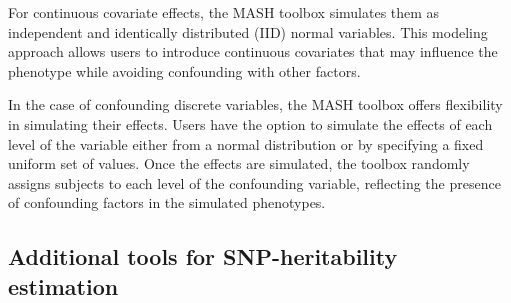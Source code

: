 \documentclass[sn-nature]{sn-jnl}%
\begin{document}
For continuous covariate effects, the MASH toolbox simulates them as independent and identically distributed (IID) normal variables. This modeling approach allows users to introduce continuous covariates that may influence the phenotype while avoiding confounding with other factors.

In the case of confounding discrete variables, the MASH toolbox offers flexibility in simulating their effects. Users have the option to simulate the effects of each level of the variable either from a normal distribution or by specifying a fixed uniform set of values. Once the effects are simulated, the toolbox randomly assigns subjects to each level of the confounding variable, reflecting the presence of confounding factors in the simulated phenotypes.

\subsection{Additional tools for SNP-heritability estimation}





\end{document}
